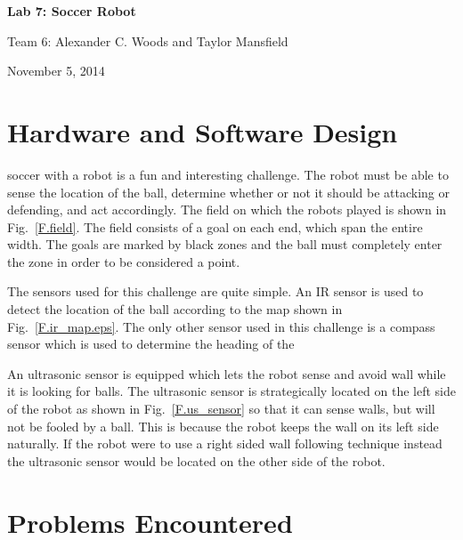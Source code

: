 \documentclass[journal]{../IEEEtran}
\begin{document}
\begin{titlepage}
    \vspace*{\fill}
    \begin{center}
      {\LARGE \bf Lab 7: Soccer Robot}

      {Team 6: Alexander  C. Woods and Taylor Mansfield}

      November 5, 2014
    \end{center}
    \vspace*{\fill}
  \end{titlepage}


\section{Hardware and Software Design}\label{S.design}
 soccer with a robot is a fun and interesting challenge. The robot must be able to sense the location of the ball, determine whether or not it should be attacking or defending, and act accordingly. The field on which the robots played is shown in Fig.~\ref{F.field}. The field consists of a goal on each end, which span the entire width. The goals are marked by black zones and the ball must completely enter the zone in order to be considered a point.


The sensors used for this challenge are quite simple. An IR sensor is used to detect the location of the ball according to the map shown in Fig.~\ref{F.ir_map.eps}. The only other sensor used in this challenge is a compass sensor which is used to determine the heading of the 

An ultrasonic sensor is equipped which lets the robot sense and avoid wall while it is looking for balls. The ultrasonic sensor is strategically located on the left side of the robot as shown in Fig.~\ref{F.us_sensor} so that it can sense walls, but will not be fooled by a ball. This is because the robot keeps the wall on its left side naturally. If the robot were to use a right sided wall following technique instead the ultrasonic sensor would be located on the other side of the robot.

\section{Problems Encountered}\label{S.problems}
\end{document}
